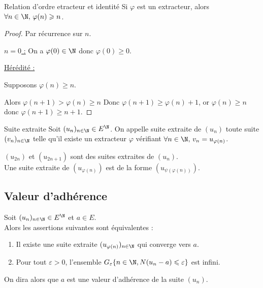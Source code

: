 \begin{proposition}{Relation d'ordre etracteur et identité}{}
    Si $\varphi$ est un extracteur, alors $\forall n \in \N, \, \varphi(n) \geqslant n$.
\end{proposition}



\begin{proof}
    Par récurrence sur $n$. 

    \uline{$n = 0$ :}
    On a $\varphi(0) \in \N$ donc $\varphi(0) \geqslant 0$.

    \uline{Hérédité :}

    Supposons $\varphi(n) \geqslant n$.

    Alors $\varphi(n + 1) > \varphi(n) \geqslant n$ 
    Donc $\varphi(n + 1) \geqslant \varphi(n) + 1$, or $\varphi(n) \geqslant n$ donc
    $\varphi(n + 1) \geqslant n + 1$.

\end{proof}


\begin{definition}{Suite extraite}{}
    Soit $(u_n)_{n \in \N} \in E^{\N}$. On appelle suite extraite de $(u_n)$ toute suite 
    $(v_n)_{n \in \N}$ telle qu'il existe un extracteur $\varphi$ vérifiant 
    $\forall n \in \N, \, v_n = u_{\varphi(n)}$.
\end{definition}

\begin{exemple}
    $(u_{2n})$ et $(u_{2n + 1})$ sont des suites extraites de $(u_n)$. \\

    Une suite extraite de $(u_{\varphi(n)})$ est de la forme $(u_{\psi (\varphi (n))})$.
\end{exemple}

\subsection{Valeur d'adhérence}

\begin{theorement}{}{}
    Soit $(u_n)_{n \in \N} \in E^{\N}$ et $a \in E$. \\

    Alors les assertions suivantes sont équivalentes :

    \begin{enumerate}
        \item Il existe une suite extraite $(u_{\varphi(n)})_{n \in \N}$ qui converge 
            vers $a$.
        \item Pour tout $\varepsilon > 0$, l'ensemble 
            $G_\varepsilon\{n \in \N, N(u_n - a) \leqslant \varepsilon\}$ est infini.
    \end{enumerate}

    On dira alors que $a$ est une valeur d'adhérence de la suite $(u_n)$.
\end{theorement}

